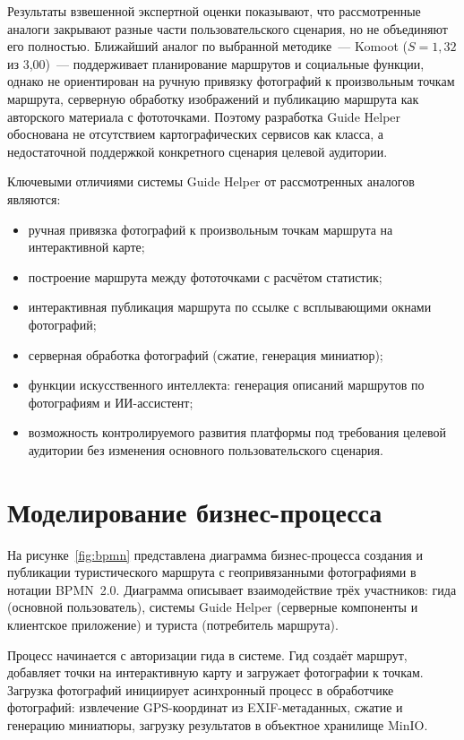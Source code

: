 Результаты взвешенной экспертной оценки показывают, что рассмотренные аналоги
закрывают разные части пользовательского сценария, но не объединяют его
полностью. Ближайший аналог по выбранной методике~--- Komoot ($S = 1{,}32$ из
3{,}00)~--- поддерживает планирование маршрутов и социальные функции, однако не
ориентирован на ручную привязку фотографий к произвольным точкам маршрута,
серверную обработку изображений и публикацию маршрута как авторского материала с
фототочками. Поэтому разработка Guide Helper обоснована не отсутствием
картографических сервисов как класса, а недостаточной поддержкой конкретного
сценария целевой аудитории.

Ключевыми отличиями системы Guide Helper от рассмотренных аналогов являются:
\begin{itemize}
  \item ручная привязка фотографий к произвольным точкам маршрута на интерактивной карте;
  \item построение маршрута между фототочками с расчётом статистик;
  \item интерактивная публикация маршрута по ссылке с всплывающими окнами фотографий;
  \item серверная обработка фотографий (сжатие, генерация миниатюр);
  \item функции искусственного интеллекта: генерация описаний маршрутов по фотографиям и ИИ-ассистент;
  \item возможность контролируемого развития платформы под требования целевой
    аудитории без изменения основного пользовательского сценария.
\end{itemize}


\section{Моделирование бизнес-процесса}

На рисунке~\ref{fig:bpmn} представлена диаграмма бизнес-процесса создания и публикации туристического маршрута с геопривязанными фотографиями в нотации BPMN~2.0. Диаграмма описывает взаимодействие трёх участников: гида (основной пользователь), системы Guide Helper (серверные компоненты и клиентское приложение) и туриста (потребитель маршрута).

Процесс начинается с авторизации гида в системе. Гид создаёт маршрут, добавляет точки на интерактивную карту и загружает фотографии к точкам. Загрузка фотографий инициирует асинхронный процесс в обработчике фотографий: извлечение GPS-координат из EXIF-метаданных, сжатие и генерацию миниатюры, загрузку результатов в объектное хранилище MinIO.

